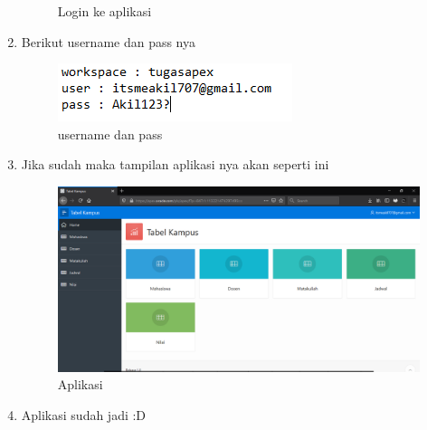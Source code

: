 \documentclass{article}
\begin{document}
\begin{enumerate}
\begin{figure}[!htbp]
        \caption{Login ke aplikasi}
    \end{figure}
    \item Berikut username dan pass nya
    \begin{figure}[!htbp]
        \centering
        \includegraphics{figure/userapex.PNG}
        \caption{username dan pass}
    \end{figure}
\newpage
    \item Jika sudah maka tampilan aplikasi nya akan seperti ini
    \begin{figure}[!htbp]
        \centering
        \includegraphics[scale=0.3]{figure/apl.PNG}
        \caption{Aplikasi}
    \end{figure}
    \item Aplikasi sudah jadi :D
    \end{enumerate}
\end{document}
